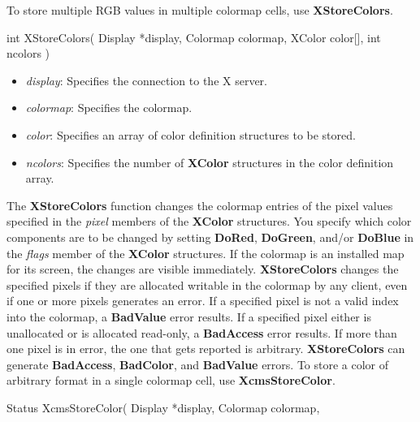 \documentclass{report}
\begin{document}
\begin{itemize}
            \bigbreak \noindent
            To store multiple RGB values in multiple colormap cells, use \textbf{XStoreColors}.
            \bigbreak \noindent
            \begin{cppcode}
                int XStoreColors(
                    Display *display,
                    Colormap colormap,
                    XColor color[],
                    int ncolors
                )
            \end{cppcode}
            \begin{itemize}
                \item \textit{display}: Specifies the connection to the X server.
                \item \textit{colormap}: Specifies the colormap.
                \item \textit{color}: Specifies an array of color definition structures to be stored.
                \item \textit{ncolors}: Specifies the number of \textbf{XColor} structures in the color definition array.
            \end{itemize}
            \noindent
            The \textbf{XStoreColors} function changes the colormap entries of the pixel values specified in the \textit{pixel} members of the \textbf{XColor} structures. You specify which color components are to be changed by setting \textbf{DoRed}, \textbf{DoGreen}, and/or \textbf{DoBlue} in the \textit{flags} member of the \textbf{XColor} structures. If the colormap is an installed map for its screen, the changes are visible immediately.
            \bigbreak \noindent
            \textbf{XStoreColors} changes the specified pixels if they are allocated writable in the colormap by any client, even if one or more pixels generates an error. If a specified pixel is not a valid index into the colormap, a \textbf{BadValue} error results. If a specified pixel either is unallocated or is allocated read-only, a \textbf{BadAccess} error results. If more than one pixel is in error, the one that gets reported is arbitrary.
            \bigbreak \noindent
            \textbf{XStoreColors} can generate \textbf{BadAccess}, \textbf{BadColor}, and \textbf{BadValue} errors.
            \bigbreak \noindent
            To store a color of arbitrary format in a single colormap cell, use \textbf{XcmsStoreColor}.
            \bigbreak \noindent
            \begin{cppcode}
                Status XcmsStoreColor(
                    Display *display,
                    Colormap colormap,

\end{cppcode}
\end{itemize}
\end{document}
